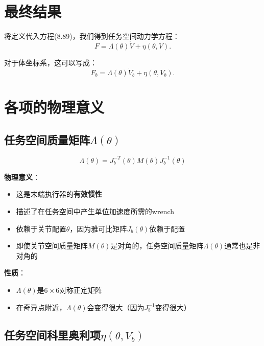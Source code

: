 \documentclass{article}
\begin{document}
\section{最终结果}

将定义代入方程(8.89)，我们得到任务空间动力学方程：
\begin{equation}
F = \Lambda(\theta)\dot{V} + \eta(\theta, V). \tag{8.89'}
\end{equation}

对于体坐标系，这可以写成：
\begin{equation}
F_b = \Lambda(\theta)\dot{V}_b + \eta(\theta, V_b).
\end{equation}

\section{各项的物理意义}

\subsection{任务空间质量矩阵$\Lambda(\theta)$}

\begin{equation}
\Lambda(\theta) = J_b^{-T}(\theta)M(\theta)J_b^{-1}(\theta)
\end{equation}

\textbf{物理意义}：
\begin{itemize}
\item 这是末端执行器的\textbf{有效惯性}
\item 描述了在任务空间中产生单位加速度所需的wrench
\item 依赖于关节配置$\theta$，因为雅可比矩阵$J_b(\theta)$依赖于配置
\item 即使关节空间质量矩阵$M(\theta)$是对角的，任务空间质量矩阵$\Lambda(\theta)$通常也是非对角的
\end{itemize}

\textbf{性质}：
\begin{itemize}
\item $\Lambda(\theta)$是$6 \times 6$对称正定矩阵
\item 在奇异点附近，$\Lambda(\theta)$会变得很大（因为$J_b^{-1}$变得很大）
\end{itemize}

\subsection{任务空间科里奥利项$\eta(\theta, V_b)$}
\end{document}
